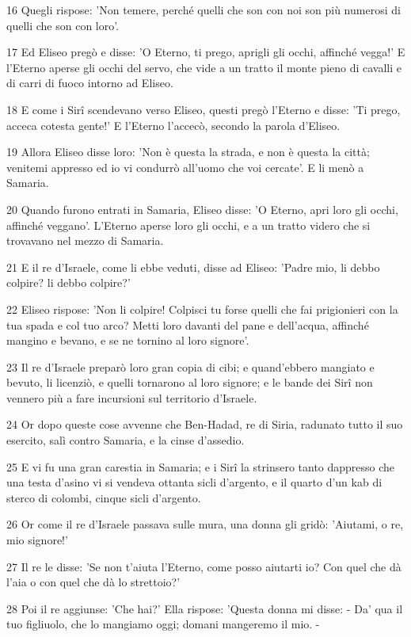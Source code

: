 \par 16 Quegli rispose: 'Non temere, perché quelli che son con noi son più numerosi di quelli che son con loro'.
\par 17 Ed Eliseo pregò e disse: 'O Eterno, ti prego, aprigli gli occhi, affinché vegga!' E l'Eterno aperse gli occhi del servo, che vide a un tratto il monte pieno di cavalli e di carri di fuoco intorno ad Eliseo.
\par 18 E come i Sirî scendevano verso Eliseo, questi pregò l'Eterno e disse: 'Ti prego, acceca cotesta gente!' E l'Eterno l'accecò, secondo la parola d'Eliseo.
\par 19 Allora Eliseo disse loro: 'Non è questa la strada, e non è questa la città; venitemi appresso ed io vi condurrò all'uomo che voi cercate'. E li menò a Samaria.
\par 20 Quando furono entrati in Samaria, Eliseo disse: 'O Eterno, apri loro gli occhi, affinché veggano'. L'Eterno aperse loro gli occhi, e a un tratto videro che si trovavano nel mezzo di Samaria.
\par 21 E il re d'Israele, come li ebbe veduti, disse ad Eliseo: 'Padre mio, li debbo colpire? li debbo colpire?'
\par 22 Eliseo rispose: 'Non li colpire! Colpisci tu forse quelli che fai prigionieri con la tua spada e col tuo arco? Metti loro davanti del pane e dell'acqua, affinché mangino e bevano, e se ne tornino al loro signore'.
\par 23 Il re d'Israele preparò loro gran copia di cibi; e quand'ebbero mangiato e bevuto, li licenziò, e quelli tornarono al loro signore; e le bande dei Sirî non vennero più a fare incursioni sul territorio d'Israele.
\par 24 Or dopo queste cose avvenne che Ben-Hadad, re di Siria, radunato tutto il suo esercito, salì contro Samaria, e la cinse d'assedio.
\par 25 E vi fu una gran carestia in Samaria; e i Sirî la strinsero tanto dappresso che una testa d'asino vi si vendeva ottanta sicli d'argento, e il quarto d'un kab di sterco di colombi, cinque sicli d'argento.
\par 26 Or come il re d'Israele passava sulle mura, una donna gli gridò: 'Aiutami, o re, mio signore!'
\par 27 Il re le disse: 'Se non t'aiuta l'Eterno, come posso aiutarti io? Con quel che dà l'aia o con quel che dà lo strettoio?'
\par 28 Poi il re aggiunse: 'Che hai?' Ella rispose: 'Questa donna mi disse: - Da' qua il tuo figliuolo, che lo mangiamo oggi; domani mangeremo il mio. -
